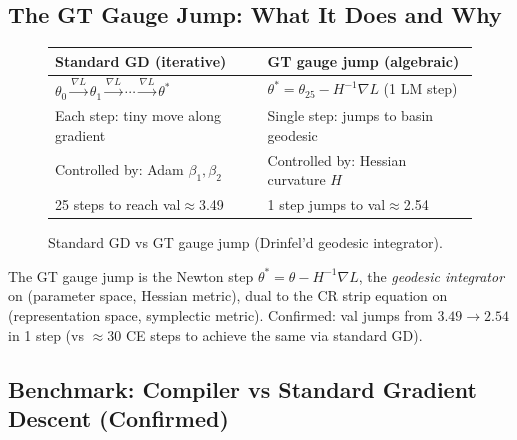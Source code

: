 \documentclass[11pt]{amsart}
\begin{document}
\subsection{The GT Gauge Jump: What It Does and Why}

\begin{figure}[h]
\centering
\begin{tabular}{ll}
\toprule
\textbf{Standard GD (iterative)} & \textbf{GT gauge jump (algebraic)} \\
\midrule
$\theta_0\xrightarrow{\nabla L}\theta_1\xrightarrow{\nabla L}\cdots
  \xrightarrow{\nabla L}\theta^*$ &
$\theta^* = \theta_{25} - H^{-1}\nabla L$ (1 LM step) \\
Each step: tiny move along gradient & Single step: jumps to basin geodesic \\
Controlled by: Adam $\beta_1,\beta_2$ & Controlled by: Hessian curvature $H$ \\
25 steps to reach val$\approx$3.49 & 1 step jumps to val$\approx$2.54 \\
\bottomrule
\end{tabular}
\caption{Standard GD vs GT gauge jump (Drinfel'd geodesic integrator).}
\label{fig:gauge_jump}
\end{figure}

The GT gauge jump is the Newton step $\theta^*=\theta-H^{-1}\nabla L$,
the \emph{geodesic integrator} on (parameter space, Hessian metric),
dual to the CR strip equation on (representation space, symplectic metric).
Confirmed: val jumps from $3.49\to 2.54$ in 1 step (vs $\approx 30$ CE steps
to achieve the same via standard GD).

\subsection{Benchmark: Compiler vs Standard Gradient Descent (Confirmed)}
\end{document}
